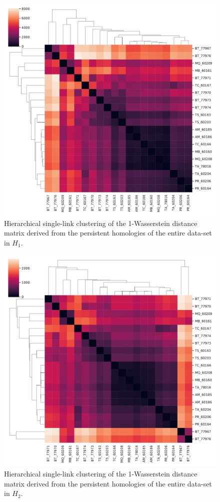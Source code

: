 \begin{figure}[ht]
  \centering
  \includegraphics[scale=0.35]{clusters/wasserstein_h1_full.pdf}
  \caption{\label{wfull1} Hierarchical single-link clustering of the 1-Wasserstein distance matrix derived from the persistent homologies of the entire data-set in $H_{1}$.}
\end{figure}



\begin{figure}[h]
  \centering
  \includegraphics[scale=0.35]{clusters/wasserstein_h2_full.pdf}
  \caption{\label{wfull2} Hierarchical single-link clustering of the 1-Wasserstein distance matrix derived from the persistent homologies of the entire data-set in $H_{2}$.}
\end{figure}

